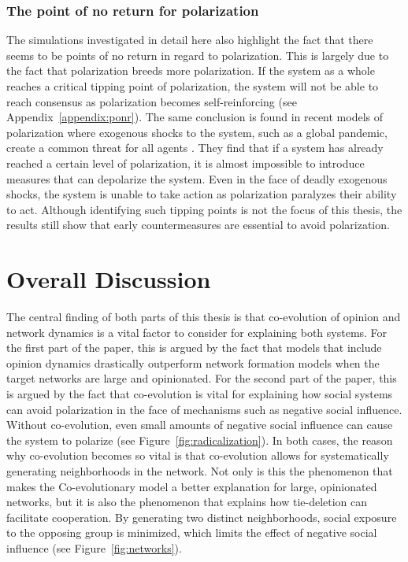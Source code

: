 \documentclass[11pt]{article}
\begin{document}
\section{The point of no return for polarization}
The simulations investigated in detail here also highlight the fact that there seems to be points of no return in regard to polarization. This is largely due to the fact that polarization breeds more polarization. If the system as a whole reaches a critical tipping point of polarization, the system will not be able to reach consensus as polarization becomes self-reinforcing (see Appendix~\ref{appendix:ponr}). The same conclusion is found in recent models of polarization where exogenous shocks to the system, such as a global pandemic, create a common threat for all agents \cite{macy2021polarization, levin_dynamics_2021}. They find that if a system has already reached a certain level of polarization, it is almost impossible to introduce measures that can depolarize the system. Even in the face of deadly exogenous shocks, the system is unable to take action as polarization paralyzes their ability to act. Although identifying such tipping points is not the focus of this thesis, the results still show that early countermeasures are essential to avoid polarization.

\part{Overall Discussion}
The central finding of both parts of this thesis is that co-evolution of opinion and network dynamics is a vital factor to consider for explaining both systems. For the first part of the paper, this is argued by the fact that models that include opinion dynamics drastically outperform network formation models when the target networks are large and opinionated. For the second part of the paper, this is argued by the fact that co-evolution is vital for explaining how social systems can avoid polarization in the face of mechanisms such as negative social influence. Without co-evolution, even small amounts of negative social influence can cause the system to polarize (see Figure~\ref{fig:radicalization}). 
In both cases, the reason why co-evolution becomes so vital is that co-evolution allows for systematically generating neighborhoods in the network. Not only is this the phenomenon that makes the Co-evolutionary model a better explanation for large, opinionated networks, but it is also the phenomenon that explains how tie-deletion can facilitate cooperation. By generating two distinct neighborhoods, social exposure to the opposing group is minimized, which limits the effect of negative social influence (see Figure~\ref{fig:networks}).
\end{document}
